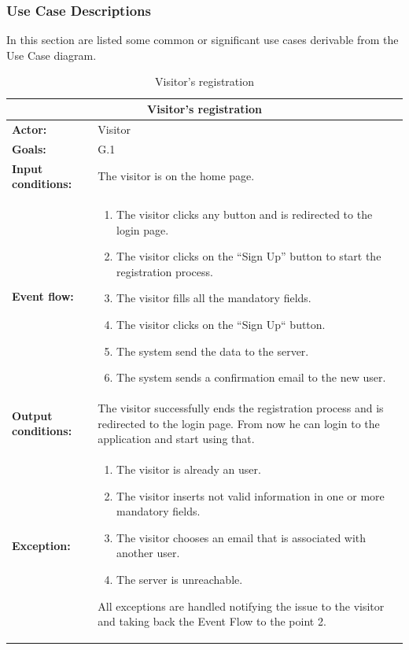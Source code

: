 \subsubsection{Use Case Descriptions}

In this section are listed some common or significant use cases derivable from
the Use Case diagram.

\begin{table}
\begin{tabular} { p{5cm} p{8cm} } 
\multicolumn{2}{c}{\textbf{Visitor's registration}}\\
\hline
\textbf{Actor:} & Visitor \\ 
\textbf{Goals:} & G.1 \\ 
\textbf{Input conditions:} & The visitor is on the home page. \\
\textbf{Event flow:} & \begin{enumerate}
						\item
						The visitor clicks any button and is redirected to the login page.
						\item
						The visitor clicks on the “Sign Up” button to start the registration process.
						\item
						The visitor fills all the mandatory fields.
						\item
						The visitor clicks on the “Sign Up“ button.
						\item
						The system send the data to the server.
						\item
						The system sends a confirmation email to the new user.
						\end{enumerate}\\ 
\textbf{Output conditions:} & The visitor successfully ends the registration process and is redirected to the login page. From now he can login to the application and start using that. \\ 
\textbf{Exception:} & \begin{enumerate}
						\item
						The visitor is already an user.
						\item
						The visitor inserts not valid information in one or more mandatory fields.
						\item
						The visitor chooses an email that is associated with another user.
						\item
						The server is unreachable.
					\end{enumerate}
All exceptions are handled notifying the issue to the visitor and taking back the Event Flow to the point 2. \\
\hline
\end{tabular}
\caption{Visitor's registration}
\label{ref:visitorsregistration}
\end{table}

